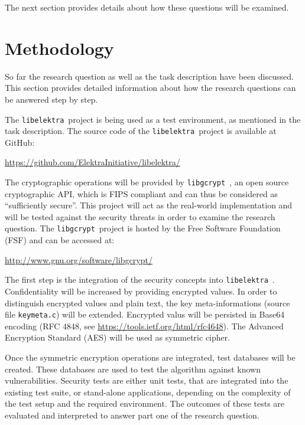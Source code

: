 \documentclass[a4paper,12pt]{article}
\newcommand{\libelektra}{\texttt{libelektra}~}
\newcommand{\libgcrypt}{\texttt{libgcrypt}~}
\begin{document}
The next section provides details about how these questions will be examined.


\section{Methodology}

So far the research question as well as the task description have been discussed.
This section provides detailed information about how the research questions can be answered step by step.

The \libelektra project is being used as a test environment, as mentioned in the task description.
The source code of the \libelektra project is available at GitHub:

\url{https://github.com/ElektraInitiative/libelektra/}

The cryptographic operations will be provided by \libgcrypt, an open source cryptographic API, which is FIPS compliant and can thus be considered as ``sufficiently secure''.
This project will act as the real-world implementation and will be tested against the security threats in order to examine the research question.
The \libgcrypt project is hosted by the Free Software Foundation (FSF) and can be accessed at:

\url{http://www.gnu.org/software/libgcrypt/}

The first step is the integration of the security concepts into \libelektra. Confidentiality will be increased by providing encrypted values. In order to distinguish encrypted values and plain text, the key meta-informations (source file \texttt{keymeta.c}) will be extended. Encrypted valus will be persisted in Base64 encoding (RFC 4848, see \url{https://tools.ietf.org/html/rfc4648}). The Advanced Encryption Standard (AES) will be used as symmetric cipher.

Once the symmetric encryption operations are integrated, test databases will be created. These databases are used to test the algorithm against known vulnerabilities. Security tests are either unit tests, that are integrated into the existing test suite, or stand-alone applications, depending on the complexity of the test setup and the required environment. The outcomes of these tests are evaluated and interpreted to answer part one of the research question.
\end{document}
